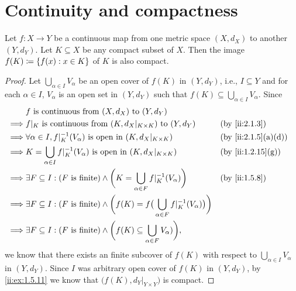 \section{Continuity and compactness}\label{ii:sec:2.3}

\begin{thm}\label{ii:2.3.1}
  Let \(f : X \to Y\) be a continuous map from one metric space \((X, d_X)\) to another \((Y, d_Y)\).
  Let \(K \subseteq X\) be any compact subset of \(X\).
  Then the image \(f(K) \coloneqq \left\lbrace f(x) : x \in K\right\rbrace\) of \(K\) is also compact.
\end{thm}

\begin{proof}
  Let \(\bigcup_{\alpha \in I} V_\alpha\) be an open cover of \(f(K)\) in \((Y, d_Y)\), i.e., \(I \subseteq Y\) and for each \(\alpha \in I\), \(V_{\alpha}\) is an open set in \((Y, d_Y)\) such that \(f(K) \subseteq \bigcup_{\alpha \in I} V_\alpha\).
  Since
  \begin{align*}
             & f \text{ is continuous from } (X, d_X) \text{ to } (Y, d_Y)                                                                                          \\
    \implies & f|_K \text{ is continuous from } (K, d_X|_{K \times K}) \text{ to } (Y, d_Y)                                                 &  & \by{ii:2.1.3}      \\
    \implies & \forall \alpha \in I, f|_K^{-1}(V_\alpha) \text{ is open in } (K, d_X|_{K \times K})                                         &  & \by{ii:2.1.5}[a,d] \\
    \implies & K = \bigcup_{\alpha \in I} f|_K^{-1}(V_\alpha) \text{ is open in } (K, d_X|_{K \times K})                                    &  & \by{ii:1.2.15}[g]  \\
    \implies & \exists F \subseteq I : (F \text{ is finite}) \land \bigg(K = \bigcup_{\alpha \in F} f|_K^{-1}(V_\alpha)\bigg)               &  & \by{ii:1.5.8}      \\
    \implies & \exists F \subseteq I : (F \text{ is finite}) \land \bigg(f(K) = f\big(\bigcup_{\alpha \in F} f|_K^{-1}(V_\alpha)\big)\bigg)                         \\
    \implies & \exists F \subseteq I : (F \text{ is finite}) \land \bigg(f(K) \subseteq \bigcup_{\alpha \in F} V_\alpha)\bigg),
  \end{align*}
  we know that there exists an finite subcover of \(f(K)\) with respect to \(\bigcup_{\alpha \in I} V_\alpha\) in \((Y, d_Y)\).
  Since \(I\) was arbitrary open cover of \(f(K)\) in \((Y, d_Y)\), by \cref{ii:ex:1.5.11} we know that \(\big(f(K), d_Y|_{Y \times Y}\big)\) is compact.
\end{proof}

